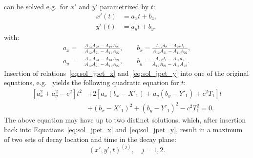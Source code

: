  can be solved e.g.\ for $x'$ and $y'$ parametrized by $t$:
\begin{eqnarray}
  x'(t) &= a_xt + b_x, \label{eq:sol_jpet_x} \\
  y'(t) &= a_yt + b_y, \label{eq:sol_jpet_y}
\end{eqnarray}
with:
\begin{eqnarray*}
  a_x =& \frac{A_{13}A_{22}-A_{12}A_{23}}{A_{12}A_{21}-A_{11}A_{22}}, \qquad b_x = \frac{A_{12}d_{2}-A_{22}d_{1}}{A_{12}A_{21}-A_{11}A_{22}}, \\
  a_y =& \frac{A_{11}A_{23}-A_{13}A_{21}}{A_{12}A_{21}-A_{11}A_{22}}, \qquad b_y = \frac{A_{21}d_{1}-A_{11}d_{2}}{A_{12}A_{21}-A_{11}A_{22}}.        
\end{eqnarray*}
Insertion of relations~\ref{eq:sol_jpet_x} and~\ref{eq:sol_jpet_y} into one of the original equations, e.g.~ yields the following quadratic equation for $t$:
\begin{equation}
  \begin{split}
    \left[ a_x^2 + a_y^2 - c^2 \right] t^2 &+ 2\left[ a_x(b_x-X'_1) + a_y(b_y-Y'_1)  + c^2T_1 \right] t \\
    &+ (b_x-X'_1)^2 + (b_y-Y'_1)^2 - c^2T_1^2  = 0.
  \end{split}
\end{equation}
The above equation may have up to two distinct solutions, which, after insertion back into Equations~\ref{eq:sol_jpet_x} and~\ref{eq:sol_jpet_y}, result in a maximum of two sets of decay location and time in the decay plane:
\begin{equation}
  \label{eq:sol_jpet_solutions}
  (x',y',t)^{(j)}, \quad j=1,2.
\end{equation}


